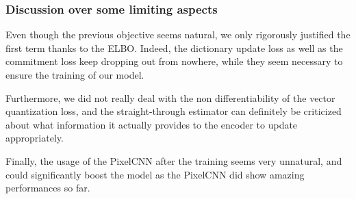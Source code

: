 \subsubsection{Discussion over some limiting aspects}

Even though the previous objective seems natural, we only rigorously justified the first term thanks to the ELBO.
Indeed, the dictionary update loss as well as the commitment loss keep dropping out from nowhere, while they seem necessary to ensure the training of our model.
\medskip

Furthermore, we did not really deal with the non differentiability of the vector quantization loss, and the straight-through estimator
can definitely be criticized about what information it actually provides to the encoder to update appropriately.
\medskip

Finally, the usage of the PixelCNN after the training seems very unnatural, and could significantly boost the model as the PixelCNN did show amazing performances so far.